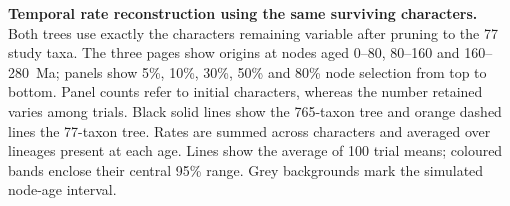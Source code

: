 \caption{\textbf{Temporal rate reconstruction using the same surviving characters.}
Both trees use exactly the characters remaining variable after pruning to
the 77 study taxa.
The three pages show origins at nodes aged 0--80, 80--160 and 160--280~Ma;
panels show 5\%, 10\%, 30\%, 50\% and 80\% node selection from top to bottom. Panel counts refer to initial
characters, whereas the number retained varies among trials.
Black solid lines show the 765-taxon tree and orange dashed lines the
77-taxon tree. Rates are summed across characters and averaged over
lineages present at each age. Lines show the average of 100 trial means; coloured bands enclose
their central 95\% range. Grey backgrounds mark the simulated node-age interval.}
